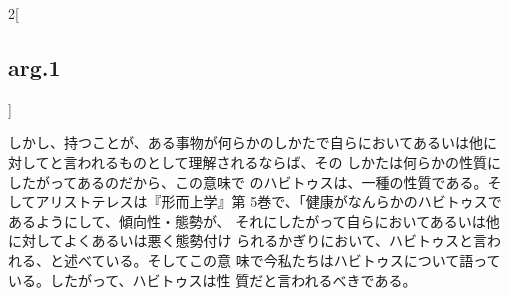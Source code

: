 \documentclass[paper=a4paper,fontsize=10pt,jafontsize=9pt,titlepage]{jlreq}
\begin{document}
\begin{paracol}{2}[\subsection{arg.1}]
\switchcolumn

しかし、持つことが、ある事物が何らかのしかたで自らにおいてあるいは他に
対してと言われるものとして理解されるならば、その
しかたは何らかの性質にしたがってあるのだから、この意味で
のハビトゥスは、一種の性質である。そしてアリストテレスは『形而上学』第
5巻で、「健康がなんらかのハビトゥスであるようにして、傾向性・態勢が、
それにしたがって自らにおいてあるいは他に対してよくあるいは悪く態勢付け
られるかぎりにおいて、ハビトゥスと言われる、と述べている。そしてこの意
味で今私たちはハビトゥスについて語っている。したがって、ハビトゥスは性
質だと言われるべきである。

\end{paracol}



\schema
{
}
{
  \schema
  {
  }
  {
  }
  {}
}
\end{document}
